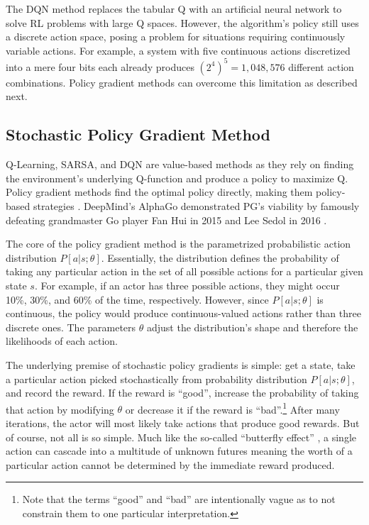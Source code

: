 The DQN method replaces the tabular Q with an artificial neural network to solve RL problems with large Q spaces. However, the algorithm's policy still uses a discrete action space, posing a problem for situations requiring continuously variable actions. For example, a system with five continuous actions discretized into a mere four bits each already produces $(2^4)^5=1,048,576$ different action combinations. Policy gradient methods can overcome this limitation as described next.

\subsection{Stochastic Policy Gradient Method}
Q-Learning, SARSA, and DQN are value-based methods as they rely on finding the environment's underlying Q-function and produce a policy to maximize Q. Policy gradient methods find the optimal policy directly, making them policy-based strategies \cite{sutton_policygrad}. DeepMind's AlphaGo demonstrated PG's viability by famously defeating grandmaster Go player Fan Hui in 2015 and Lee Sedol in 2016 \cite{silver_2017}.

The core of the policy gradient method is the parametrized probabilistic action distribution $P[a|s;\theta]$. Essentially, the distribution defines the probability of taking any particular action in the set of all possible actions for a particular given state $s$. For example, if an actor has three possible actions, they might occur 10\%, 30\%, and 60\% of the time, respectively. However, since $P[a|s;\theta]$ is continuous, the policy would produce continuous-valued actions rather than three discrete ones. The parameters $\theta$ adjust the distribution's shape and therefore the likelihoods of each action. 

The underlying premise of stochastic policy gradients is simple: get a state, take a particular action picked stochastically from probability distribution $P[a|s;\theta]$, and record the reward. If the reward is ``good'', increase the probability of taking that action by modifying $\theta$ or decrease it if the reward is ``bad''.\footnote{Note that the terms ``good'' and ``bad'' are intentionally vague as to not constrain them to one particular interpretation.} After many iterations, the actor will most likely take actions that produce good rewards. But of course, not all is so simple. Much like the so-called ``butterfly effect'' \cite{Lorenz_1963}, a single action can cascade into a multitude of unknown futures meaning the worth of a particular action cannot be determined by the immediate reward produced.

